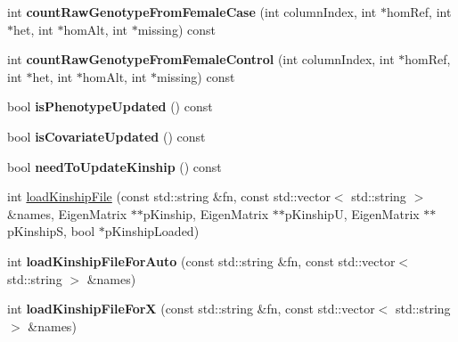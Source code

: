 \begin{DoxyCompactItemize}
\item 
\hypertarget{classDataConsolidator_a339b61163ca0dd39b4ca2f644593a0fc}{int {\bfseries count\-Raw\-Genotype\-From\-Female\-Case} (int column\-Index, int $\ast$hom\-Ref, int $\ast$het, int $\ast$hom\-Alt, int $\ast$missing) const }\label{classDataConsolidator_a339b61163ca0dd39b4ca2f644593a0fc}

\item 
\hypertarget{classDataConsolidator_a5b0ed490343fd48b40fe472a70f1e873}{int {\bfseries count\-Raw\-Genotype\-From\-Female\-Control} (int column\-Index, int $\ast$hom\-Ref, int $\ast$het, int $\ast$hom\-Alt, int $\ast$missing) const }\label{classDataConsolidator_a5b0ed490343fd48b40fe472a70f1e873}

\item 
\hypertarget{classDataConsolidator_ab54c06be926fc7e0bfe5026b7bd197e6}{bool {\bfseries is\-Phenotype\-Updated} () const }\label{classDataConsolidator_ab54c06be926fc7e0bfe5026b7bd197e6}

\item 
\hypertarget{classDataConsolidator_acae7e76efa22c884538b479e09d71db9}{bool {\bfseries is\-Covariate\-Updated} () const }\label{classDataConsolidator_acae7e76efa22c884538b479e09d71db9}

\item 
\hypertarget{classDataConsolidator_a86023411ac6e73487bb79d25c1b5f915}{bool {\bfseries need\-To\-Update\-Kinship} () const }\label{classDataConsolidator_a86023411ac6e73487bb79d25c1b5f915}

\item 
int \hyperlink{classDataConsolidator_af21210c0105a31392d49c1afcd1e2d78}{load\-Kinship\-File} (const std\-::string \&fn, const std\-::vector$<$ std\-::string $>$ \&names, Eigen\-Matrix $\ast$$\ast$p\-Kinship, Eigen\-Matrix $\ast$$\ast$p\-Kinship\-U, Eigen\-Matrix $\ast$$\ast$p\-Kinship\-S, bool $\ast$p\-Kinship\-Loaded)
\item 
\hypertarget{classDataConsolidator_a5a3b62e3bbbd9bf0c99e3d7da8176f8d}{int {\bfseries load\-Kinship\-File\-For\-Auto} (const std\-::string \&fn, const std\-::vector$<$ std\-::string $>$ \&names)}\label{classDataConsolidator_a5a3b62e3bbbd9bf0c99e3d7da8176f8d}

\item 
\hypertarget{classDataConsolidator_a30666fc84801cfd6e41252ba9d8838f0}{int {\bfseries load\-Kinship\-File\-For\-X} (const std\-::string \&fn, const std\-::vector$<$ std\-::string $>$ \&names)}\label{classDataConsolidator_a30666fc84801cfd6e41252ba9d8838f0}


\end{DoxyCompactItemize}

